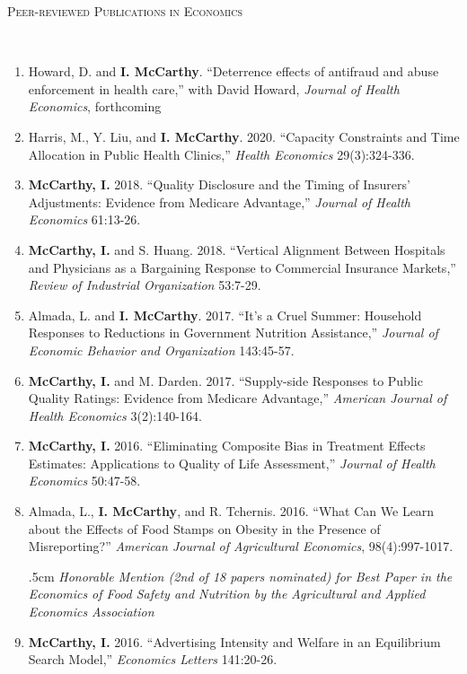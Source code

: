 \documentclass[9pt]{article}
\newenvironment{changemargin}[2]{%
  \begin{list}{}{%
    \setlength{\topsep}{0pt}%
    \setlength{\leftmargin}{#1}%
    \setlength{\rightmargin}{#2}%
    \setlength{\listparindent}{\parindent}%
    \setlength{\itemindent}{\parindent}%
    \setlength{\parsep}{\parskip}%
  }%
  \item[]}{\end{list}
}
\newenvironment{mytab}{\begin{adjustwidth}{.5cm}{}}{\end{adjustwidth}}
\newcommand{\lineover}{
	\begin{changemargin}{-0.05in}{-0.05in}
		\vspace*{-8pt}
		\hrulefill \\
		\vspace*{-2pt}
	\end{changemargin}
}
\newcommand{\header}[1]{
	\begin{changemargin}{-0.5in}{-0.5in}
		\scshape{#1}\\
  	\lineover
	\end{changemargin}
}
\newenvironment{body} {
	\vspace*{-16pt}
	\begin{changemargin}{-0.25in}{-0.5in}
  }	
	{\end{changemargin}
}
\begin{document}
\header{Peer-reviewed Publications in Economics}
\begin{body}
  \vspace{14pt}
  \begin{enumerate}
    \item Howard, D. and \textbf{I. McCarthy}. ``Deterrence effects of antifraud and abuse enforcement in health care,'' with David Howard, \textit{Journal of Health Economics}, forthcoming
    \item Harris, M., Y. Liu, and \textbf{I. McCarthy}. 2020. ``Capacity Constraints and Time Allocation in Public Health Clinics,'' \textit{Health Economics} 29(3):324-336.
    \item \textbf{McCarthy, I.} 2018. ``Quality Disclosure and the Timing of Insurers' Adjustments: Evidence from Medicare Advantage,'' \textit{Journal of Health Economics} 61:13-26.
    \item \textbf{McCarthy, I.} and S. Huang. 2018. ``Vertical Alignment Between Hospitals and Physicians as a Bargaining Response to Commercial Insurance Markets,'' \textit{Review of Industrial Organization} 53:7-29.
    \item Almada, L. and \textbf{I. McCarthy}. 2017. ``It's a Cruel Summer: Household Responses to Reductions in Government Nutrition Assistance,'' \textit{Journal of Economic Behavior and Organization} 143:45-57.
    \item \textbf{McCarthy, I.} and M. Darden. 2017. ``Supply-side Responses to Public Quality Ratings: Evidence from Medicare Advantage,'' \textit{American Journal of Health Economics} 3(2):140-164.
    \item \textbf{McCarthy, I.} 2016. ``Eliminating Composite Bias in Treatment Effects Estimates: Applications to Quality of Life Assessment,'' \textit{Journal of Health Economics} 50:47-58.
    \item Almada, L., \textbf{I. McCarthy}, and R. Tchernis. 2016. ``What Can We Learn about the Effects of Food Stamps on Obesity in the Presence of Misreporting?'' \textit{American Journal of Agricultural Economics}, 98(4):997-1017. \\
        \begin{mytab} \textit{Honorable Mention (2nd of 18 papers nominated) for Best Paper in the Economics of Food Safety and Nutrition by the Agricultural and Applied Economics Association}
        \end{mytab}
    \item \textbf{McCarthy, I.} 2016. ``Advertising Intensity and Welfare in an Equilibrium Search Model,'' \textit{Economics Letters} 141:20-26.

\end{enumerate}
\end{body}
\end{document}
